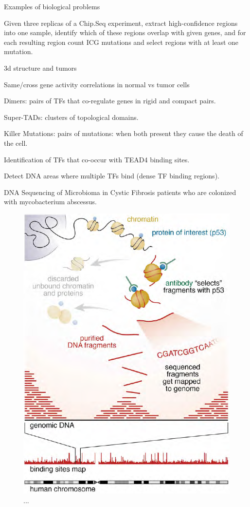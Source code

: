 \documentclass[journal]{IEEEtran}
\begin{document}
Examples of biological problems

Given three replicas of a Chip.Seq experiment, extract high-confidence regions into one sample, identify which of these regions overlap with given genes, and for each resulting region count ICG mutations and select regions with at least one mutation.

3d structure and tumors

Same/cross gene activity correlations in normal vs tumor cells

Dimers: pairs of TFs that co-regulate genes in rigid and compact pairs.

Super-TADs: clusters of topological domains.

Killer Mutations: pairs of mutations: when both present they cause the death of the cell.

Identification of TFs that co-occur with TEAD4 binding sites.

Detect DNA areas where multiple TFs bind (dense TF binding regions).

DNA Sequencing of Microbioma in Cystic Fibrosis patients who are colonized with mycobacterium abscessus.

\begin{figure}
  \includegraphics[width=\linewidth]{chip-seq_workflow}
  \caption{...}
  \label{fig:chipseq}
\end{figure}
\end{document}
